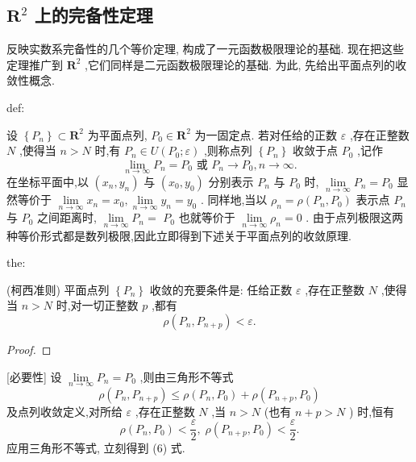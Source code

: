 \subsection{ \({\mathbf{R}}^{2}\) 上的完备性定理}

反映实数系完备性的几个等价定理, 构成了一元函数极限理论的基础. 现在把这些定理推广到 \({\mathbf{R}}^{2}\) ,它们同样是二元函数极限理论的基础. 为此, 先给出平面点列的收敛性概念.

\begin{definition}{}{def:}

\end{definition}
设 \(\left\{  {P}_{n}\right\}   \subset  {\mathbf{R}}^{2}\) 为平面点列, \({P}_{0} \in  {\mathbf{R}}^{2}\) 为一固定点. 若对任给的正数 \(\varepsilon\) ,存在正整数 \(N\) ,使得当 \(n > N\) 时,有 \({P}_{n} \in  U\left( {{P}_{0};\varepsilon }\right)\) ,则称点列 \(\left\{  {P}_{n}\right\}\) 收敛于点 \({P}_{0}\) ,记作
\[
\mathop{\lim }\limits_{{n \rightarrow  \infty }}{P}_{n} = {P}_{0}\text{ 或 }{P}_{n} \rightarrow  {P}_{0},n \rightarrow  \infty .
\]
在坐标平面中,以 \(\left( {{x}_{n},{y}_{n}}\right)\) 与 \(\left( {{x}_{0},{y}_{0}}\right)\) 分别表示 \({P}_{n}\) 与 \({P}_{0}\) 时, \(\mathop{\lim }\limits_{{n \rightarrow  \infty }}{P}_{n} = {P}_{0}\) 显然等价于 \(\mathop{\lim }\limits_{{n \rightarrow  \infty }}{x}_{n} = {x}_{0},\mathop{\lim }\limits_{{n \rightarrow  \infty }}{y}_{n} = {y}_{0}\) . 同样地,当以 \({\rho }_{n} = \rho \left( {{P}_{n},{P}_{0}}\right)\) 表示点 \({P}_{n}\) 与 \({P}_{0}\) 之间距离时, \(\mathop{\lim }\limits_{{n \rightarrow  \infty }}{P}_{n} =\)  \({P}_{0}\) 也就等价于 \(\mathop{\lim }\limits_{{n \rightarrow  \infty }}{\rho }_{n} = 0\) . 由于点列极限这两种等价形式都是数列极限,因此立即得到下述关于平面点列的收敛原理.

\begin{theorem}{}{the:}

\end{theorem}
 (柯西准则) 平面点列 \(\left\{  {P}_{n}\right\}\) 收敛的充要条件是: 任给正数 \(\varepsilon\) ,存在正整数 \(N\) ,使得当 \(n > N\) 时,对一切正整数 \(p\) ,都有
\[
\rho \left( {{P}_{n},{P}_{n + p}}\right)  < \varepsilon . \tag{6}
\]
\begin{proof}

\end{proof}
[必要性] 设 \(\mathop{\lim }\limits_{{n \rightarrow  \infty }}{P}_{n} = {P}_{0}\) ,则由三角形不等式
\[
\rho \left( {{P}_{n},{P}_{n + p}}\right)  \leq  \rho \left( {{P}_{n},{P}_{0}}\right)  + \rho \left( {{P}_{n + p},{P}_{0}}\right)
\]
及点列收敛定义,对所给 \(\varepsilon\) ,存在正整数 \(N\) ,当 \(n > N\) (也有 \(n + p > N\) ) 时,恒有
\[
\rho \left( {{P}_{n},{P}_{0}}\right)  < \frac{\varepsilon }{2},\;\rho \left( {{P}_{n + p},{P}_{0}}\right)  < \frac{\varepsilon }{2}.
\]
应用三角形不等式, 立刻得到 (6) 式.

